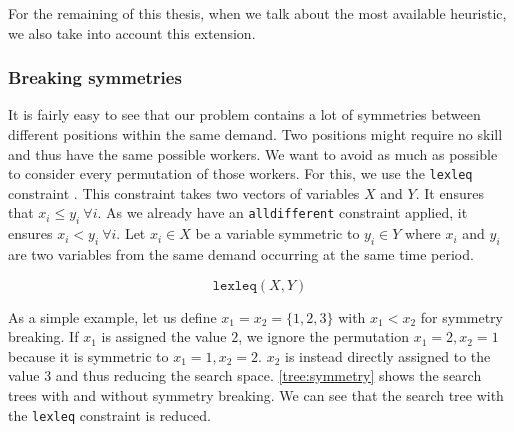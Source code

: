 \documentclass[../../thesis.tex]{subfiles}
\begin{document}
For the remaining of this thesis, when we talk about the most available heuristic, we also take into account this extension.

\subsubsection{Breaking symmetries}

It is fairly easy to see that our problem contains a lot of symmetries between different positions within the same demand. 
Two positions might require no skill and thus have the same possible workers. We want to avoid as much as possible to consider every permutation of those workers.
For this, we use the \texttt{lexleq} constraint \cite{Alan:Lex}. This constraint takes two vectors of variables $X$ and $Y$. It ensures that 
$x_i \leq y_i \ \forall i$. As we already have an \texttt{alldifferent} constraint applied, it ensures $x_i < y_i \ \forall i$.
Let $x_i \in X$ be a variable symmetric to $y_i \in Y$ where $x_i$ and $y_i$ are two variables from the same demand occurring at the same time period.


\begin{equation}
  \texttt{lexleq}(X, Y)
\end{equation}

As a simple example, let us define $x_1 = x_2 = \{ 1, 2, 3 \}$ with $x_1 < x_2$ for symmetry breaking. If 
$x_1$ is assigned the value $2$, we ignore the permutation $x_1 = 2, x_2 = 1$ because it is symmetric to $x_1 = 1, x_2 = 2$. $x_2$ is instead directly assigned to the value $3$ and thus reducing the search space.
\autoref{tree:symmetry} shows the search trees with and without symmetry breaking. We can see that the search tree with the \texttt{lexleq} constraint is reduced.

\end{document}
